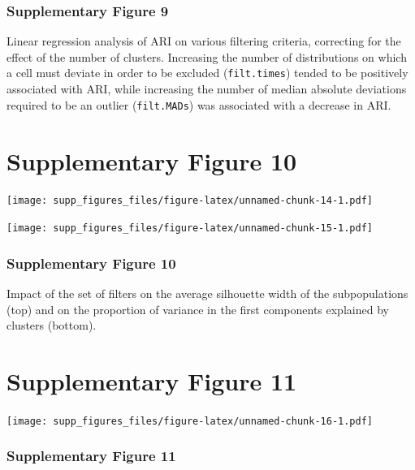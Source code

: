 \documentclass[]{article}
\begin{document}
\hypertarget{supplementary-figure-9-1}{%
\subsubsection{Supplementary Figure 9}\label{supplementary-figure-9-1}}

Linear regression analysis of ARI on various filtering criteria,
correcting for the effect of the number of clusters. Increasing the
number of distributions on which a cell must deviate in order to be
excluded (\texttt{filt.times}) tended to be positively associated with
ARI, while increasing the number of median absolute deviations required
to be an outlier (\texttt{filt.MADs}) was associated with a decrease in
ARI.

\newpage

\hypertarget{supplementary-figure-10}{%
\section{Supplementary Figure 10}\label{supplementary-figure-10}}

\texttt{[image: supp\_figures\_files/figure-latex/unnamed-chunk-14-1.pdf]}

\texttt{[image: supp\_figures\_files/figure-latex/unnamed-chunk-15-1.pdf]}

\hypertarget{supplementary-figure-10-1}{%
\subsubsection{Supplementary Figure
10}\label{supplementary-figure-10-1}}

Impact of the set of filters on the average silhouette width of the
subpopulations (top) and on the proportion of variance in the first
components explained by clusters (bottom).

\newpage

\hypertarget{supplementary-figure-11}{%
\section{Supplementary Figure 11}\label{supplementary-figure-11}}

\texttt{[image: supp\_figures\_files/figure-latex/unnamed-chunk-16-1.pdf]}

\hypertarget{supplementary-figure-11-1}{%
\subsubsection{Supplementary Figure
11}\label{supplementary-figure-11-1}}
\end{document}
